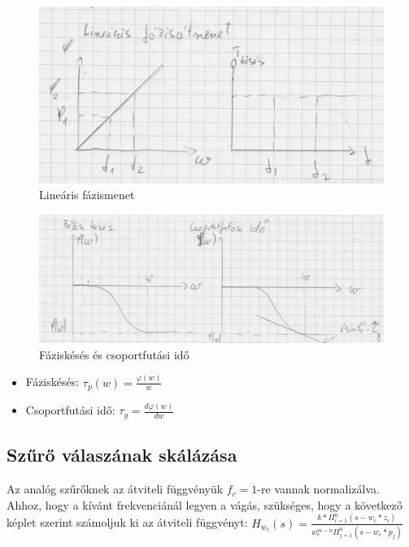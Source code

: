 \begin{figure}[H]
    \centering
    \includegraphics[scale=0.25]{figures/szuro_lin_menet.jpg}
    \caption{Lineáris fázismenet}
\end{figure}

\begin{figure}[H]
    \centering
    \includegraphics[scale=0.20]{figures/szuro_faz_csoport.jpg}
    \caption{Fáziskésés és csoportfutási idő}
\end{figure}

\begin{itemize}
    \item Fáziskésés: $\tau_{p}(w) = \frac{\varphi(w)}{w} $
    \item Csoportfutási idő: $\tau_{g}=\frac{d\varphi(w)}{dw}$
\end{itemize}


\subsection{Szűrő válaszának skálázása}

Az analóg szűrőknek az átviteli függvényük $f_{c} = 1$-re vannak normalizálva. Ahhoz, hogy a kívánt frekvenciánál legyen a vágás, szükséges, hogy a következő képlet szerint számoljuk ki az átviteli függvényt: $H_{w_{c}}(s) = \frac{k * \Pi_{i=1}^{n}(s - w_{c} * z_{i})}{w_{c}^{m - n} \Pi_{j=1}^{n} (s - w_{c}*p_{j})}$

